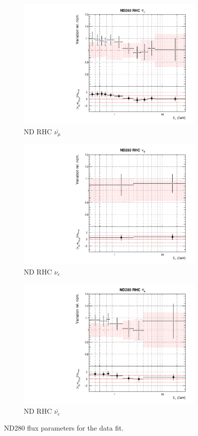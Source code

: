 \begin{figure}[!htbp]
\begin{subfigure}{0.45\textwidth}
\end{subfigure}
\begin{subfigure}{0.45\textwidth}
  \centering
  \includegraphics[width=0.75\linewidth]{figs/datflux5}
  \caption{ND RHC $\bar{\nu_{\mu}}$}
\end{subfigure}
\begin{subfigure}{0.45\textwidth}
  \centering
  \includegraphics[width=0.75\linewidth]{figs/datflux6}
  \caption{ND RHC $\nu_{e}$}
\end{subfigure}
\begin{subfigure}{0.45\textwidth}
  \centering
  \includegraphics[width=0.75\linewidth]{figs/datflux7}
  \caption{ND RHC $\bar{\nu_e}$}
\end{subfigure}
\caption{ND280 flux parameters for the data fit.}
\label{fig:datfluxNDapp}
\end{figure}


